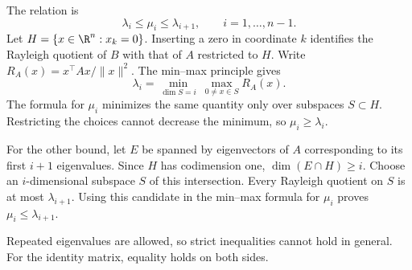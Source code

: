 The relation is
\[
 \boxed{\lambda_i\le\mu_i\le\lambda_{i+1}},
 \qquad i=1,\ldots,n-1.
\]
Let $H=\{x\in\R^n:x_k=0\}$. Inserting a zero in coordinate $k$ identifies the Rayleigh quotient of $B$ with that of $A$ restricted to $H$. Write $R_A(x)=x^\top Ax/\|x\|^2$. The min--max principle gives
\[
 \lambda_i=\min_{\dim S=i}\ \max_{0\ne x\in S}R_A(x).
\]
The formula for $\mu_i$ minimizes the same quantity only over subspaces $S\subset H$. Restricting the choices cannot decrease the minimum, so $\mu_i\ge\lambda_i$.

For the other bound, let $E$ be spanned by eigenvectors of $A$ corresponding to its first $i+1$ eigenvalues. Since $H$ has codimension one, $\dim(E\cap H)\ge i$. Choose an $i$-dimensional subspace $S$ of this intersection. Every Rayleigh quotient on $S$ is at most $\lambda_{i+1}$. Using this candidate in the min--max formula for $\mu_i$ proves $\mu_i\le\lambda_{i+1}$.

Repeated eigenvalues are allowed, so strict inequalities cannot hold in general. For the identity matrix, equality holds on both sides.

